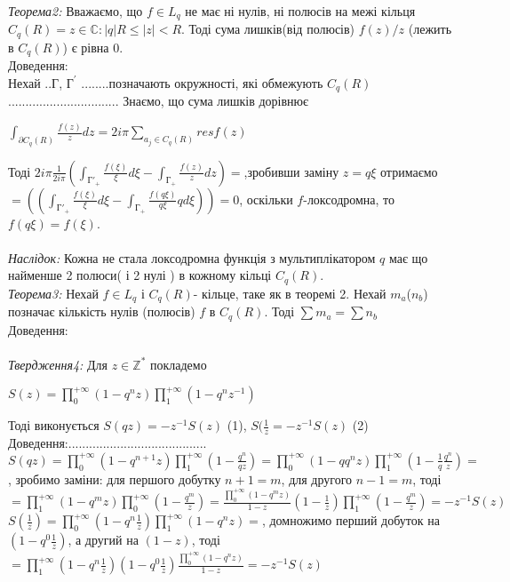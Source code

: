 \documentclass[12pt,a4paper]{article}
\begin{document}
\emph{Теорема2:} Вважаємо, що $f\in L_{q}$ не має ні нулів, ні полюсів на межі кільця $C_{q}(R)={z\in \mathbb{C}:\left |q  \right |R\leq \left |z  \right |<R }$. Тоді сума лишків(від полюсів) $f(z)/z$ (лежить в $C_{q}(R)$) є рівна $0$.\\
Доведення:\\
Нехай ..$Г$, $Г^{'}$ ........позначають окружності, які обмежують $C_{q}(R)$................................
Знаємо, що сума лишків дорівнює
\begin{center}
$\int_{\partial C_{q}(R)}^{ } \frac{f(z)}{z}dz=2i\pi \sum_{a_{j}\in C_{q}(R)}^{ } resf(z)$
\end{center}
Тоді $2i\pi \frac{1}{2i\pi}(\int_{Г'_{+}}^{ } \frac{f(\xi )}{\xi }d\xi -\int_{Г_{+}}^{ }\frac{f(z)}{z}dz)=$,зробивши заміну $z=q\xi$ отримаємо $=((\int_{Г'_{+}}^{ } \frac{f(\xi )}{\xi }d\xi -\int_{Г_{+}}^{ }\frac{f(q\xi)}{q\xi}qd\xi))=0$, оскільки $f$-локсодромна, то $f(q\xi)=f(\xi)$.\\
\\
\emph{Наслідок:} Кожна не стала локсодромна функція з мультиплікатором $q$ має що найменше 2 полюси( і 2 нулі ) в кожному кільці $C_{q}(R)$.\\
  
\emph{Теорема3:} Нехай $f\in L_{q}$ і $C_{q}(R)$- кільце, таке як в теоремі 2. Нехай $m_{a}$($n_{b}$) позначає кількість нулів (полюсів) $f$ в $C_{q}(R)$. Тоді $\sum m_{a}=\sum n_{b}$ \\
Доведення:\\
\\

\emph{Твердження4:} Для $z \in \mathbb{Z}^{*}$ покладемо
  \begin{center}
	$S(z)= \prod_{0}^{+\infty } ( 1-q^{n}z ) \prod_{1}^{+\infty }( 1-q^{n}z^{-1} )$
  \end{center} Тоді виконується $S(qz)=-z^{-1}S(z)$ (1), $S(\frac{1}{z}=-z^{-1}S(z)$ (2)\\
Доведення:........................................\\
$S(qz)= \prod_{0}^{+\infty } ( 1-q^{n+1}z ) \prod_{1}^{+\infty }( 1-\frac{q^{n}}{qz})=
 \prod_{0}^{+\infty } ( 1-qq^{n}z ) \prod_{1}^{+\infty }( 1-\frac{1}{q}\frac{q^{n}}{z})=$, зробимо заміни: для першого добутку $n+1=m$, для другого $n-1=m$, тоді $=\prod_{1}^{+\infty } ( 1-q^{m}z ) \prod_{0}^{+\infty }( 1-\frac{q^{m}}{z})=\frac{\prod_{0}^{+\infty } ( 1-q^{m}z )}{1-z}(1-\frac{1}{z})\prod_{1}^{+\infty }( 1-\frac{q^{m}}{z})=-z^{-1}S(z)$ \\
 $S(\frac{1}{z})= \prod_{0}^{+\infty } ( 1-q^{n}\frac{1}{z} ) \prod_{1}^{+\infty }( 1-q^{n}z)=$, домножимо перший добуток на $(1-q^{0}\frac{1}{z})$, а другий на $(1-z)$, тоді $=\prod_{1}^{+\infty } ( 1-q^{n}\frac{1}{z} )(1-q^{0}\frac{1}{z})\frac{ \prod_{0}^{+\infty }( 1-q^{n}z)}{1-z}=-z^{-1}S(z)$\\
 
\end{document}

